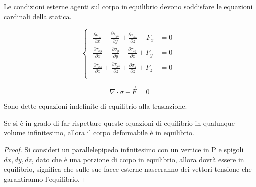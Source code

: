 \documentclass{article}
\begin{document}
\begin{adjustwidth}{2in}{}
	Le condizioni esterne agenti sul corpo in equilibrio devono soddisfare le equazioni
	cardinali della statica.
	
	 \[
	\begin{cases}
		\begin{aligned}
	\frac{\partial\sigma_x}{\partial x} + \frac{\partial \tau_{yx}}{\partial y} + \frac{\partial \tau_{zx}}{\partial z} + F_x & =0 \\
	
	\frac{\partial \tau_{xy}}{\partial x} + \frac{\partial\sigma_y}{\partial y} + \frac{\partial \tau_{zy}}{\partial z} + F_y & =0 \\
	
	\frac{\partial \tau_{xz}}{\partial x} + \frac{\partial \tau_{yz}}{\partial z} + \frac{\partial\sigma_z}{\partial z} + F_z & =0 \\
	\end{aligned}
	\end{cases}
	\]
	
	\[
	\nabla \cdot \sigma + \vec{F} = 0
	\]
	
	Sono dette equazioni indefinite di equilibrio alla traslazione. \newline 
	
	Se si è in grado di far rispettare queste equazioni di equilibrio in qualunque volume infinitesimo, allora il corpo deformabile è in equilibrio. 
	
	\begin{proof}
		
	
	Si consideri un parallelepipedo
	infinitesimo con un vertice in P e spigoli
	$ dx, dy, dz $, dato che è una porzione di corpo in equilibrio, allora dovrà essere in equilibrio, significa che sulle sue facce esterne nasceranno dei vettori tensione che garantiranno l'equilibrio. 
	

\end{proof}
\end{adjustwidth}
\end{document}
